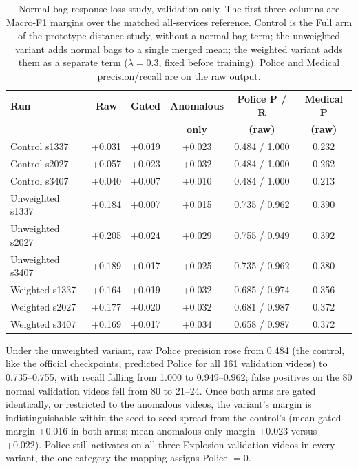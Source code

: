 \begin{table}[tbp]
    \centering
    \small
    \caption[Normal-bag response-loss study, validation only.]{Normal-bag response-loss study, validation only. The first three columns are Macro-F1 margins over the matched all-services reference. Control is the Full arm of the prototype-distance study, without a normal-bag term; the unweighted variant adds normal bags to a single merged mean; the weighted variant adds them as a separate term ($\lambda=0.3$, fixed before training). Police and Medical precision/recall are on the raw output.}
    \label{tab:results-normal-bag}
    \begin{tabular}{@{}lccccc@{}}
        \toprule
        \textbf{Run} & \textbf{Raw} & \textbf{Gated} & \textbf{Anomalous} & \textbf{Police P / R} & \textbf{Medical P} \\
                     &              &                & \textbf{only}      & \textbf{(raw)}        & \textbf{(raw)} \\
        \midrule
        Control s1337    & +0.031 & +0.019 & +0.023 & 0.484 / 1.000 & 0.232 \\
        Control s2027    & +0.057 & +0.023 & +0.032 & 0.484 / 1.000 & 0.262 \\
        Control s3407    & +0.040 & +0.007 & +0.010 & 0.484 / 1.000 & 0.213 \\
        Unweighted s1337 & +0.184 & +0.007 & +0.015 & 0.735 / 0.962 & 0.390 \\
        Unweighted s2027 & +0.205 & +0.024 & +0.029 & 0.755 / 0.949 & 0.392 \\
        Unweighted s3407 & +0.189 & +0.017 & +0.025 & 0.735 / 0.962 & 0.380 \\
        Weighted s1337   & +0.164 & +0.019 & +0.032 & 0.685 / 0.974 & 0.356 \\
        Weighted s2027   & +0.177 & +0.020 & +0.032 & 0.681 / 0.987 & 0.372 \\
        Weighted s3407   & +0.169 & +0.017 & +0.034 & 0.658 / 0.987 & 0.372 \\
        \bottomrule
    \end{tabular}
\end{table}

Under the unweighted variant, raw Police precision rose from 0.484 (the
control, like the official checkpoints, predicted Police for all 161
validation videos) to 0.735--0.755, with recall falling from 1.000 to
0.949--0.962; false positives on the 80 normal validation videos fell from 80
to 21--24. Once both arms are gated identically, or restricted to the
anomalous videos, the variant's margin is indistinguishable within the
seed-to-seed spread from the control's (mean gated margin +0.016 in both
arms; mean anomalous-only margin +0.023 versus +0.022). Police still activates
on all three Explosion validation videos in every variant, the one category
the mapping assigns Police $=0$.

